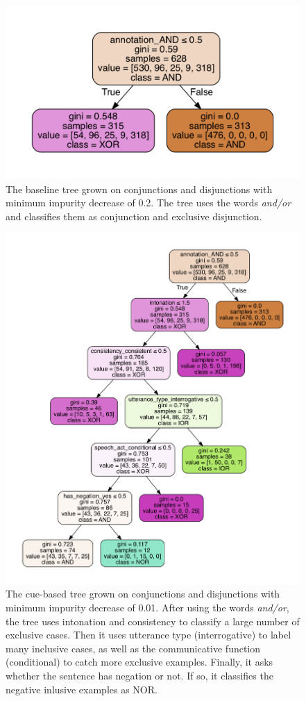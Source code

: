 \documentclass[floatsintext,man]{apa6}
\theoremstyle{definition}
\theoremstyle{definition}
\theoremstyle{definition}
\theoremstyle{remark}
\begin{document}
\begin{figure}
\centering
\includegraphics{figs/wholeBaseline-1.pdf}
\caption{\label{fig:wholeBaseline}The baseline tree grown on conjunctions
and disjunctions with minimum impurity decrease of 0.2. The tree uses
the words \textit{and/or} and classifies them as conjunction and
exclusive disjunction.}
\end{figure}

\begin{figure}
\centering
\includegraphics{figs/wholeCueBased-1.pdf}
\caption{\label{fig:wholeCueBased}The cue-based tree grown on conjunctions
and disjunctions with minimum impurity decrease of 0.01. After using the
words \textit{and/or}, the tree uses intonation and consistency to
classify a large number of exclusive cases. Then it uses utterance type
(interrogative) to label many inclusive cases, as well as the
communicative function (conditional) to catch more exclusive examples.
Finally, it asks whether the sentence has negation or not. If so, it
classifies the negative inlusive examples as NOR.}
\end{figure}
\end{document}
